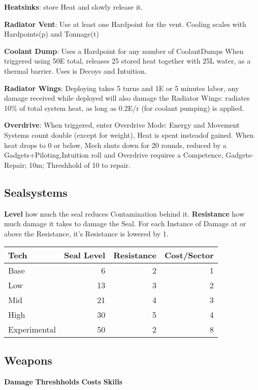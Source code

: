 \textbf{Heatsinks}: store Heat and slowly release it.

\textbf{Radiator Vent}: Use at least one Hardpoint for the vent.
Cooling scales with Hardpoints(p) and Tonnage(t)

\textbf{Coolant Dump}: Uses a Hardpoint for any number of CoolantDumps When triggered using 50E total,
releases 25 stored heat together with 25L water, as a thermal barrier.
Uses is Decoys and Intuition.


\textbf{Radiator Wings}: Deploying takes 5 turns and 1E or 5 minutes labor, any damage received while deployed
will also damage the Radiator Wings: radiates 10\% of total system heat, as long as 0.2E/r (for coolant pumping)
is applied.

\textbf{Overdrive}: When triggered, enter Overdrive Mode: Energy and Movement Systems count double (except for weight),
Heat is spent insteadof gained.
When heat drops to 0 or below, Mech shuts down for 20 rounds, reduced by a Gadgets+Piloting,Intuition roll and
Overdrive requires a Competence, Gadgets-Repair;
10m;
Threshhold of 10 to repair.

\subsection{Sealsystems}\label{subsec:sealsystems}
\textbf{Level} how much the seal reduces Contamination behind it.
\textbf{Resistance} how much damage it takes to damage the Seal.
For each Instance of Damage at or above the Resistance, it's Resistance is lowered by 1.

\begin{tabular}{l|r|r|r}
    Tech & Seal Level & Resistance & Cost/Sector\\\hline
    Base &  6 & 2 & 1\\
    Low &   13& 3 & 2\\
    Mid &   21& 4 & 3\\
    High &  30& 5 & 4\\
    Experimental& 50 & 2 &8
\end{tabular}\par

\subsection{Weapons}\label{subsec:weapons}
\textbf{Damage}
\textbf{Threshholds}
\textbf{Costs}
\textbf{Skills}

